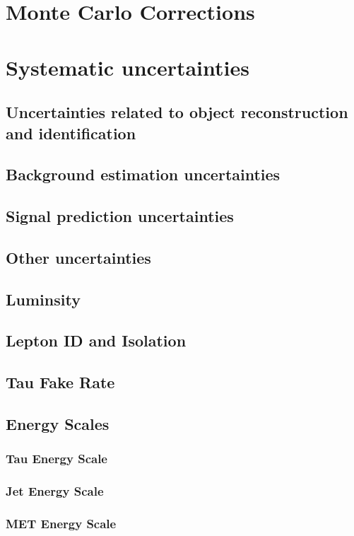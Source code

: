 \section{Monte Carlo Corrections}
\label{sec:vh_mc_corrections}



\section{Systematic uncertainties}
\label{sec:vh_systematics}
\subsection{Uncertainties related to object reconstruction and identification}
\subsection{Background estimation uncertainties}
\subsection{Signal prediction uncertainties}
\subsection{Other uncertainties}
\subsection{Luminsity}
\subsection{Lepton ID and Isolation}
\subsection{Tau Fake Rate}
\subsection{Energy Scales}
\subsubsection{Tau Energy Scale}
\subsubsection{Jet Energy Scale}
\subsubsection{MET Energy Scale}
